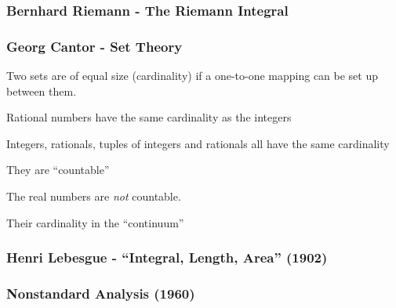 \documentclass{beamer}
\begin{document}
\begin{frame}
\frametitle{Bernhard Riemann - The Riemann Integral}
\end{frame}

\begin{frame}
\frametitle{Georg Cantor - Set Theory}

Two sets are of equal size (cardinality) if a one-to-one mapping can be set up between them.

Rational numbers have the same cardinality as the integers

Integers, rationals, tuples of integers and rationals all have the same cardinality

They are ``countable''

The real numbers are {\it not} countable.

Their cardinality in the ``continuum''
\end{frame}

\begin{frame}
\frametitle{Henri Lebesgue - ``Integral, Length, Area'' (1902)}


\end{frame}

\begin{frame}
\frametitle{Nonstandard Analysis (1960)}
\end{frame}
\end{document}
